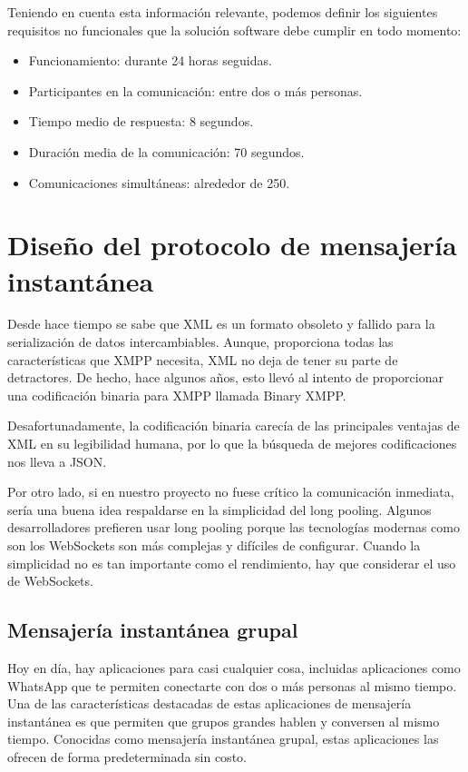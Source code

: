 Teniendo en cuenta esta información relevante, podemos definir los siguientes requisitos no funcionales que la solución software debe cumplir en todo momento:

\begin{itemize}
  \item Funcionamiento: durante 24 horas seguidas.
  \item Participantes en la comunicación: entre dos o más personas.
  \item Tiempo medio de respuesta: 8 segundos.
  \item Duración media de la comunicación: 70 segundos.
  \item Comunicaciones simultáneas: alrededor de 250.
\end{itemize}

\section{Diseño del protocolo de mensajería instantánea}

Desde hace tiempo se sabe que XML es un formato obsoleto y fallido para la serialización de datos intercambiables. Aunque, proporciona todas las características que XMPP necesita, XML no deja de tener su parte de detractores. De hecho, hace algunos años, esto llevó al intento de proporcionar una codificación binaria para XMPP llamada Binary XMPP.

Desafortunadamente, la codificación binaria carecía de las principales ventajas de XML en su legibilidad humana, por lo que la búsqueda de mejores codificaciones nos lleva a JSON.

Por otro lado, si en nuestro proyecto no fuese crítico la comunicación inmediata, sería una buena idea respaldarse en la simplicidad del long pooling. Algunos desarrolladores prefieren usar long pooling porque las tecnologías modernas como son los WebSockets son más complejas y difíciles de configurar. Cuando la simplicidad no es tan importante como el rendimiento, hay que considerar el uso de WebSockets.

\subsection{Mensajería instantánea grupal}

Hoy en día, hay aplicaciones para casi cualquier cosa, incluidas aplicaciones como WhatsApp que te permiten conectarte con dos o más personas al mismo tiempo. Una de las características destacadas de estas aplicaciones de mensajería instantánea es que permiten que grupos grandes hablen y conversen al mismo tiempo. Conocidas como mensajería instantánea grupal, estas aplicaciones las ofrecen de forma predeterminada sin costo.

